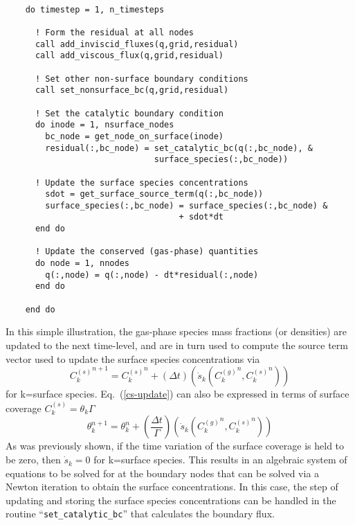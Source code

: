 \documentclass{report}
\newcommand{\eref}[1]{Eq.~(\ref{#1})}
\newcommand{\sk}{\dot{s}_k}
\newcommand{\cg}[1]{{C_{#1}^{(g)}}}
\newcommand{\cs}[1]{{C_{#1}^{(s)}}}
\begin{document}
\begin{enumerate}[label=(\alph*)]
    \begin{lstlisting}[language=FORTRAN, caption=Simple Implementation]

    do timestep = 1, n_timesteps

      ! Form the residual at all nodes
      call add_inviscid_fluxes(q,grid,residual)
      call add_viscous_flux(q,grid,residual)

      ! Set other non-surface boundary conditions
      call set_nonsurface_bc(q,grid,residual)

      ! Set the catalytic boundary condition
      do inode = 1, nsurface_nodes
        bc_node = get_node_on_surface(inode)
        residual(:,bc_node) = set_catalytic_bc(q(:,bc_node), &
                              surface_species(:,bc_node))

      ! Update the surface species concentrations
        sdot = get_surface_source_term(q(:,bc_node))
        surface_species(:,bc_node) = surface_species(:,bc_node) &
                                   + sdot*dt
      end do

      ! Update the conserved (gas-phase) quantities
      do node = 1, nnodes
        q(:,node) = q(:,node) - dt*residual(:,node)
      end do

    end do

    \end{lstlisting}
    In this simple illustration, the gas-phase species mass fractions (or
    densities) are updated to the next time-level, and are in turn used to
    compute the source term vector used to update the surface species
    concentrations via
    \begin{equation}
      \cs{k}^{n+1} = \cs{k}^{n} + \left(\Delta
      t\right)\left(\sk(\cg{k}^{n},\cs{k}^{n})\right)
      \label{cs-update}
    \end{equation}
    for k=surface species.  \eref{cs-update} can also be expressed in terms of
    surface coverage $\cs{k} = \theta_k \Gamma$
    \begin{equation}
      \theta_{k}^{n+1} = \theta_{k}^{n} + \left(\frac{\Delta t}{\Gamma}
      \right)\left(\sk(\cg{k}^{n},\cs{k}^{n})\right)
      \label{theta-update}
    \end{equation}
    As was previously shown, if the time variation of the surface coverage is
    held to be zero, then $\sk = 0$ for k=surface species.  This results in an
    algebraic system of equations to be solved for at the boundary nodes that
    can be solved via a Newton iteration to obtain the surface concentrations.
    In this case, the step of updating and storing the surface species
    concentrations can be handled in the routine ``\verb|set_catalytic_bc|''
    that calculates the boundary flux.  
    

\end{enumerate}
\end{document}
